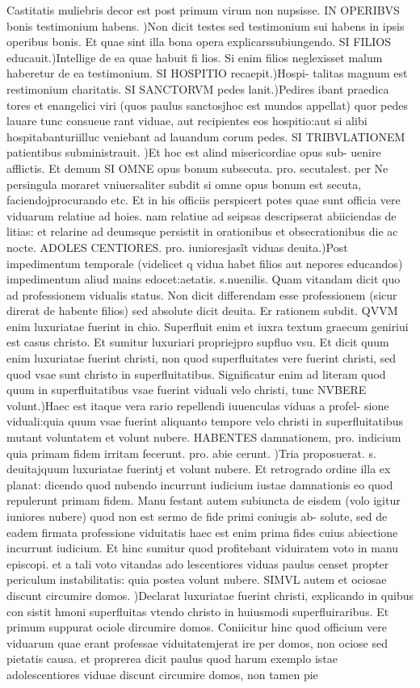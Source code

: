 \documentclass{article}
\begin{document}
\begin{pages}
Castitatis muliebris decor est post primum virum non nupsisse. IN OPERIBVS bonis testimonium habens. )Non dicit testes sed testimonium sui habens in ipsis operibus bonis. Et quae sint illa bona opera explicarssubiungendo. SI FILIOS educauit.)Intellige de ea quae habuit fi lios. Si enim filios neglexisset malum haberetur de ea testimonium. SI HOSPITIO recaepit.)Hospi- talitas magnum est restimonium charitatis. SI SANCTORVM pedes lanit.)Pedires ibant praedica tores et enangelici viri (quos paulus sanctosjhoc est mundos appellat) quor pedes lauare tunc consueue rant viduae, aut recipientes eos hospitio:aut si alibi hospitabanturiilluc veniebant ad lauandum corum pedes. SI TRIBVLATIONEM patientibus subministrauit. )Et hoc est alind misericordiae opus sub- uenire afflictis. Et demum SI OMNE opus bonum subsecuta. pro. secutalest. per Ne persingula moraret vniuersaliter subdit si omne opus bonum est secuta, faciendojprocurando etc. Et in his officiis perspicert potes quae sunt officia vere viduarum relatiue ad hoies. nam relatiue ad seipsas descripserat abiiciendas de litias: et relarine ad deumsque persistit in orationibus et obsecrationibus die ac nocte.  \pend\pstart ADOLES CENTIORES. pro. iunioresjasĩt viduas deuita.)Post impedimentum temporale (videlicet q vidua habet filios aut nepores educandos) impedimentum aliud mains edocet:aetatis. s.nuenilis. Quam vitandam dicit quo ad professionem vidualis status. Non dicit differendam esse professionem (sicur direrat de habente filios) sed absolute dicit deuita. Er rationem subdit. QVVM enim luxuriatae fuerint in chio. Superfluit enim et iuxra textum graecum geniriui est casus christo. Et sumitur luxuriari propriejpro supfluo vsu. Et dicit quum enim luxuriatae fuerint christi, non quod superfluitates vere fuerint christi, sed quod vsae sunt christo in superfluitatibus. Significatur enim ad literam quod quum in superfluitatibus vsae fuerint viduali velo christi, tunc NVBERE volunt.)Haec est itaque vera rario repellendi iuuenculas viduas a profel- sione viduali:quia quum vsae fuerint aliquanto tempore velo christi in superfluitatibus mutant voluntatem et volunt nubere. HABENTES damnationem, pro. indicium quia primam fidem irritam fecerunt. pro. abie cerunt. )Tria proposuerat. s. deuitajquum luxuriatae fuerintj et volunt nubere. Et retrogrado ordine illa ex planat: dicendo quod nubendo incurrunt iudicium iustae damnationis eo quod repulerunt primam fidem. Manu festant autem subiuncta de eisdem (volo igitur iuniores nubere) quod non est sermo de fide primi coniugis ab- solute, sed de eadem firmata professione viduitatis haec est enim prima fides cuius abiectione incurrunt iudicium. Et hinc sumitur quod profitebant viduiratem voto in manu episcopi. et a tali voto vitandas ado lescentiores viduas paulus censet propter periculum instabilitatis: quia postea volunt nubere. SIMVL autem et ociosae discunt circumire domos. )Declarat luxuriatae fuerint christi, explicando in quibus con sistit hmoni superfluitas vtendo christo in huiusmodi superfluiraribus. Et primum suppurat ociole dircumire domos. Coniicitur hinc quod officium vere viduarum quae erant professae viduitatemjerat ire per domos, non ociose sed pietatis causa. et proprerea dicit paulus quod harum exemplo istae adolescentiores viduae discunt circumire domos, non tamen pie 
\end{pages}
\end{document}
